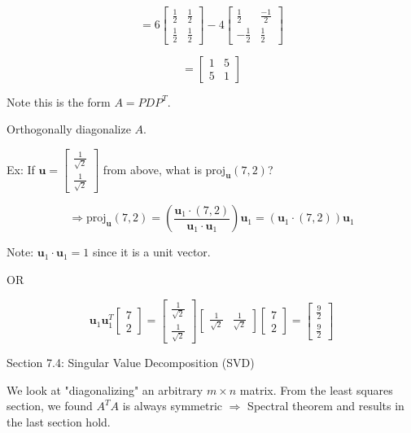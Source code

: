 \documentclass{article}
\begin{document}
\[= 6\begin{bmatrix} \frac{1}{2} & \frac{1}{2} \\ \frac{1}{2} & \frac{1}{2} \end{bmatrix} - 4\begin{bmatrix} \frac{1}{2} & \frac{-1}{2}\\ -\frac{1}{2} & \frac{1}{2} \end{bmatrix} \]

\[= \begin{bmatrix} 1 & 5 \\ 5 & 1 \end{bmatrix}\]

Note this is the form $A = PDP^T$.

Orthogonally diagonalize $A$.

Ex: If $\mathbf{u} = \begin{bmatrix} \frac{1}{\sqrt{2}} \\ \frac{1}{\sqrt{2}} \end{bmatrix}$ from above, what is $\text{proj}_{\mathbf{u}} (7,2)$?

\[\Rightarrow \text{proj}_{\mathbf{u}} (7,2) = \left(\frac{\mathbf{u}_1 \cdot (7, 2)}{\mathbf{u}_1 \cdot \mathbf{u}_1}\right) \mathbf{u}_1 = (\mathbf{u}_1 \cdot (7, 2)) \mathbf{u}_1\]

Note: $\mathbf{u}_1 \cdot \mathbf{u}_1 = 1$ since it is a unit vector.

OR

\[\mathbf{u}_1\mathbf{u}_1^T \begin{bmatrix} 7 \\ 2 \end{bmatrix} = \begin{bmatrix} \frac{1}{\sqrt{2}} \\ \frac{1}{\sqrt{2}} \end{bmatrix}\begin{bmatrix} \frac{1}{\sqrt{2}} & \frac{1}{\sqrt{2}} \end{bmatrix} \begin{bmatrix} 7 \\ 2 \end{bmatrix} = \begin{bmatrix} \frac{9}{2} \\ \frac{9}{2} \end{bmatrix}\]


Section 7.4: Singular Value Decomposition (SVD)

We look at "diagonalizing" an arbitrary $m \times n$ matrix. From the least squares section, we found $A^TA$ is always symmetric $\Rightarrow$ Spectral theorem and results in the last section hold.
\end{document}
